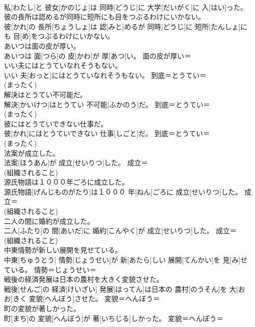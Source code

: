 \documentclass[8pt]{extreport}
\begin{document}
\begin{CJK}{UTF8}{min}
\\	私[わたし]と 彼女[かのじょ]は 同時[どうじ]に 大学[だいがく]に 入[はい]った。	
\\	彼の長所は認めるが同時に短所にも目をつぶるわけにいかない。	
\\	彼[かれ]の 長所[ちょうしょ]は 認[みと]めるが 同時[どうじ]に 短所[たんしょ]にも 目[め]をつぶるわけにいかない。	
\\	あいつは面の皮が厚い。	
\\	あいつは 面[つら]の 皮[かわ]が 厚[あつ]い。	面の皮が厚い＝ 
\\	いい夫にはとうていなれそうもない。	
\\	いい 夫[おっと]にはとうていなれそうもない。	到底＝とうてい＝ 
\\	(まったく) 
\\	解決はとうてい不可能だ。	
\\	解決[かいけつ]はとうてい 不可能[ふかのう]だ。	到底＝とうてい＝ 
\\	(まったく) 
\\	彼にはとうていできない仕事だ。	
\\	彼[かれ]にはとうていできない 仕事[しごと]だ。	到底＝とうてい＝ 
\\	(まったく) 
\\	法案が成立した。	
\\	法案[ほうあん]が 成立[せいりつ]した。	成立＝ 
\\	(組織されること) 
\\	源氏物語は１０００年ごろに成立した。	
\\	源氏物語[げんじものがたり]は１０００ 年[ねん]ごろに 成立[せいりつ]した。	成立＝ 
\\	(組織されること) 
\\	二人の間に婚約が成立した。	
\\	二人[ふたり]の 間[あいだ]に 婚約[こんやく]が 成立[せいりつ]した。	成立＝ 
\\	(組織されること) 
\\	中東情勢が新しい展開を見せている。	
\\	中東[ちゅうとう] 情勢[じょうせい]が 新[あたら]しい 展開[てんかい]を 見[み]せている。	情勢＝じょうせい＝ 
\\	戦後の経済発展は日本の農村を大きく変貌させた。	
\\	戦後[せんご]の 経済[けいざい] 発展[はってん]は日本の 農村[のうそん]を 大[おお]きく 変貌[へんぼう]させた。	変貌＝へんぼう＝ 
\\	町の変貌が著しかった。	
\\	町[まち]の 変貌[へんぼう]が 著[いちじる]しかった。	変貌＝へんぼう＝ 

\end{CJK}
\end{document}

